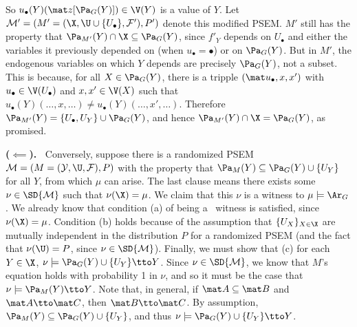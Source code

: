 \begin{subappendices}
\begin{lproof}
{    So $u_\bullet(Y)( \mat z[\Pa_G(Y)] ) \in \V(Y)$ is a value of $Y$.
    Let $\mathcal M' = (M' = (\X, \U \cup \{ U_\bullet\}, \mathcal F'), P')$ denote this modified PSEM. 
    $M'$ still has the property that $\Pa_{M'}(Y) \cap \X \subseteq \Pa_{G}(Y)$, since $f'_Y$ depends on $U_\bullet$ and either the variables it previously depended on (when $u_\bullet = \bullet$) or on $\Pa_G(Y)$.
    But in $M'$, the endogenous variables on which $Y$ depends are precisely $\Pa_G(Y)$, not a subset.
    This is because, for all $X \in \Pa_G(Y)$, there is a tripple $(\mat u_\bullet, x, x')$ with $u_\bullet \in \V(U_\bullet)$ and $x,x' \in \V(X)$ such that $u_\bullet(Y)(\ldots, x, \ldots) \ne u_\bullet(Y)(\ldots, x', \ldots)$. 
    Therefore $\Pa_{M'}(Y) = \{ U_\bullet, U_Y \} \cup \Pa_G(Y)$,
        and hence $\Pa_{M'}(Y) \cap \X = \Pa_G(Y)$, as promised. 
}
    
    \medskip
    
    \textbf{($\impliedby$).~} Conversely, suppose there is a randomized PSEM 
    $\mathcal M = (M = (\mathcal Y,\U, \mathcal F), P)$
     with the property that
    $\Pa_M(Y) \subseteq \Pa_G(Y) \cup \{ U_Y \}$ for all $Y$,
    from which $\mu$ can arise. 
    The last clause means there exists some $\nu \in \SD{\cal M}$ such that $\nu(\X) = \mu$.
    We claim that this $\nu$ is a witness to $\mu \models \Ar_G$. 
    We already know that condition (a) of being a \scibility\ witness is satisfied, since $\nu(\X) = \mu$. 
    Condition (b) holds because of the assumption that $\{ U_X \}_{X \in \X}$ are mutually independent in the distribution $P$ for a randomized PSEM (and the fact that $\nu(\U) = P$, since $\nu \in \SD{\mathcal M}$).
    Finally, we must show that (c) for each  $Y \in \X$, 
    $\nu \models \Pa_G(Y) \cup \{ U_Y \} \tto Y$. 
    Since $\nu \in \SD{\cal M}$, we know that $M$'s equation holds with probability 1 in $\nu$, and so it must be the case that $\nu \models \Pa_M(Y) \tto Y$. 
    Note that, in general, if $\mat A \subseteq \mat B$ and $\mat A \tto \mat C$, then $\mat B \tto \mat C$.
    By assumption, $\Pa_M(Y) \subseteq \Pa_G(Y) \cup \{U_Y\}$, and thus $\nu \models \Pa_G(Y) \cup \{U_Y\} \tto Y$.
    
    

\end{lproof}
\end{subappendices}
